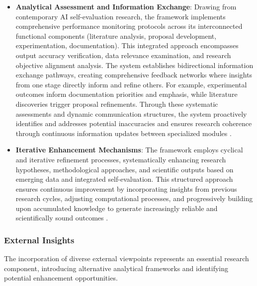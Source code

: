 \begin{itemize}

    \item \textbf{Analytical Assessment and Information Exchange}: Drawing from contemporary AI self-evaluation research, the framework implements comprehensive performance monitoring protocols across its interconnected functional components (literature analysis, proposal development, experimentation, documentation). This integrated approach encompasses output accuracy verification, data relevance examination, and research objective alignment analysis. The system establishes bidirectional information exchange pathways, creating comprehensive feedback networks where insights from one stage directly inform and refine others. For example, experimental outcomes inform documentation priorities and emphasis, while literature discoveries trigger proposal refinements. Through these systematic assessments and dynamic communication structures, the system proactively identifies and addresses potential inaccuracies and ensures research coherence through continuous information updates between specialized modules \cite{renze2024self, ji2023towards}.
    
    \item \textbf{Iterative Enhancement Mechanisms}: The framework employs cyclical and iterative refinement processes, systematically enhancing research hypotheses, methodological approaches, and scientific outputs based on emerging data and integrated self-evaluation. This structured approach ensures continuous improvement by incorporating insights from previous research cycles, adjusting computational processes, and progressively building upon accumulated knowledge to generate increasingly reliable and scientifically sound outcomes \cite{li2023metaagents, dong2024multi, wu2023autogen}.
    
\end{itemize}



\subsubsection*{External Insights}

The incorporation of diverse external viewpoints represents an essential research component, introducing alternative analytical frameworks and identifying potential enhancement opportunities.


